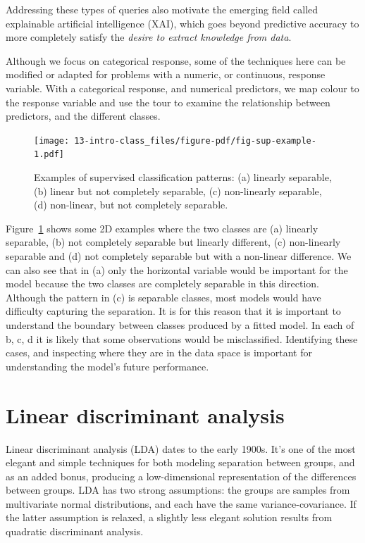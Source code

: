 \documentclass[
  letterpaper,
]{krantz}
\begin{document}
Addressing these types of queries also motivate the emerging field
called explainable artificial intelligence (XAI), which goes beyond
predictive accuracy to more completely satisfy the \emph{desire to
extract knowledge from data}.

Although we focus on categorical response, some of the techniques here
can be modified or adapted for problems with a numeric, or continuous,
response variable. With a categorical response, and numerical
predictors, we map colour to the response variable and use the tour to
examine the relationship between predictors, and the different classes.

\begin{figure}

{\centering \texttt{[image: 13-intro-class\_files/figure-pdf/fig-sup-example-1.pdf]}

}

\caption{\label{fig-sup-example}Examples of supervised classification
patterns: (a) linearly separable, (b) linear but not completely
separable, (c) non-linearly separable, (d) non-linear, but not
completely separable.}

\end{figure}

Figure~\ref{fig-sup-example} shows some 2D examples where the two
classes are (a) linearly separable, (b) not completely separable but
linearly different, (c) non-linearly separable and (d) not completely
separable but with a non-linear difference. We can also see that in (a)
only the horizontal variable would be important for the model because
the two classes are completely separable in this direction. Although the
pattern in (c) is separable classes, most models would have difficulty
capturing the separation. It is for this reason that it is important to
understand the boundary between classes produced by a fitted model. In
each of b, c, d it is likely that some observations would be
misclassified. Identifying these cases, and inspecting where they are in
the data space is important for understanding the model's future
performance.

\hypertarget{sec-lda}{%
\chapter{Linear discriminant analysis}\label{sec-lda}}


Linear discriminant analysis (LDA) dates to the early 1900s. It's one of
the most elegant and simple techniques for both modeling separation
between groups, and as an added bonus, producing a low-dimensional
representation of the differences between groups. LDA has two strong
assumptions: the groups are samples from multivariate normal
distributions, and each have the same variance-covariance. If the latter
assumption is relaxed, a slightly less elegant solution results from
quadratic discriminant analysis.
\end{document}
